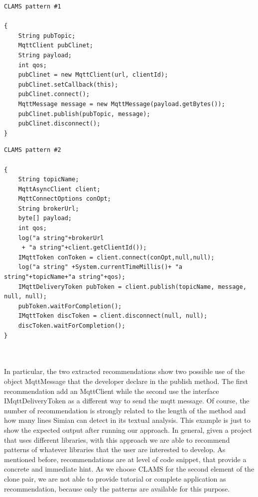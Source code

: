 \noindent
\begin{minipage}[t]{0.4\textwidth}
\begin{lstlisting}
CLAMS pattern #1

{
    String pubTopic;
    MqttClient pubClinet;
    String payload;
    int qos;
    pubClinet = new MqttClient(url, clientId);
    pubClinet.setCallback(this);
    pubClinet.connect();
    MqttMessage message = new MqttMessage(payload.getBytes());
    pubClinet.publish(pubTopic, message);
    pubClinet.disconnect();
}
\end{lstlisting}
\end{minipage}
\hfill
\begin{minipage}[t]{0.5\textwidth}

\begin{lstlisting}
CLAMS pattern #2

{
    String topicName;
    MqttAsyncClient client;
    MqttConnectOptions conOpt;
    String brokerUrl;
    byte[] payload;
    int qos;
    log("a string"+brokerUrl
     + "a string"+client.getClientId());
    IMqttToken conToken = client.connect(conOpt,null,null);
    log("a string" +System.currentTimeMillis()+ "a string"+topicName+"a string"+qos);
    IMqttDeliveryToken pubToken = client.publish(topicName, message, null, null);
    pubToken.waitForCompletion();
    IMqttToken discToken = client.disconnect(null, null);
    discToken.waitForCompletion();
}

	
\end{lstlisting}
\end{minipage}
\newline
In particular, the two extracted recommendations show two possible use of the object MqttMessage that the developer declare in the publish method. The first recommendation add an MqttClient while the second use the interface IMqttDeliveryToken as a different way to send the mqtt message. Of course, the number of recommendation is strongly related to the length of the method and how many lines Simian can detect in its textual analysis. This example is just to show the expected output after running our approach. In general, given a project that uses different libraries, with this approach we are able to recommend patterns of whatever libraries that the user are interested to develop. As mentioned before, recommendations are at level of code snippet, that provide a concrete and immediate hint. As we choose CLAMS for the second element of the clone pair, we are not able to provide tutorial or complete application as recommendation, because only the patterns are available for this purpose. \\
